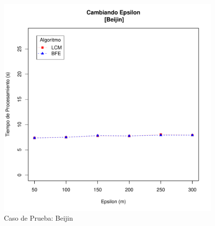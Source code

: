 \begin{figure}
  \centering
  \includegraphics[scale=0.4]{pictures/Beijin.pdf}
  \caption{Caso de Prueba: Beijin}
  \label{fig:Beijin}
\end{figure}
